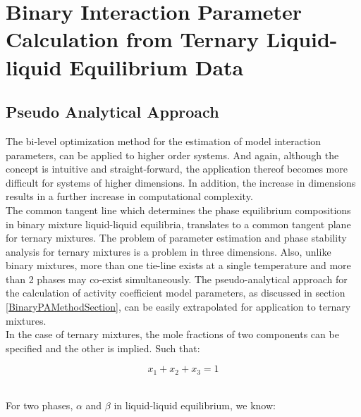 \section{Binary Interaction Parameter Calculation from Ternary Liquid-liquid Equilibrium Data}

\subsection{Pseudo Analytical Approach}

The bi-level optimization method for the estimation of model interaction parameters, can be applied to higher order systems. And again, although the concept is intuitive and straight-forward, the application thereof becomes more difficult for systems of higher dimensions. In addition, the increase in dimensions results in a further increase in computational complexity.\\

The common tangent line which determines the phase equilibrium compositions in binary mixture liquid-liquid equilibria, translates to a common tangent plane for ternary mixtures. The problem of parameter estimation and phase stability analysis for ternary mixtures is a problem in three dimensions. Also, unlike binary mixtures, more than one tie-line exists at a single temperature and more than 2 phases may co-exist simultaneously. The pseudo-analytical approach for the calculation of activity coefficient model parameters, as discussed in section \ref{BinaryPAMethodSection}, can be easily extrapolated for application to ternary mixtures.\\

In the case of ternary mixtures, the mole fractions of two components can be specified and the other is implied. Such that:\

\begin{equation}
x_{1} + x_{2} + x_{3} = 1
\end{equation}\

For two phases, $\alpha$ and $\beta$ in liquid-liquid equilibrium, we know:\

